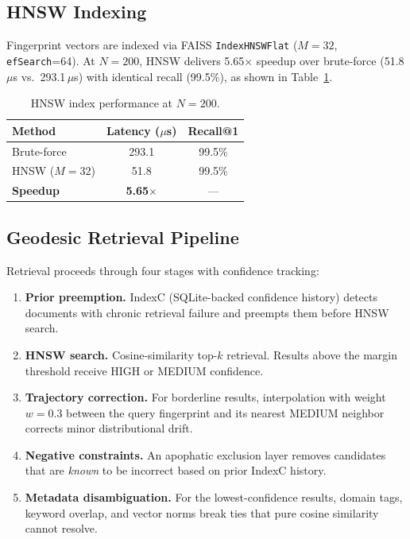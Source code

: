 \documentclass[11pt,twocolumn]{article}
\begin{document}
\subsection{HNSW Indexing}
\label{sec:hnsw}

Fingerprint vectors are indexed via FAISS \texttt{IndexHNSWFlat}
($M{=}32$, \texttt{efSearch}{=}64). At $N{=}200$, HNSW delivers
5.65$\times$ speedup over brute-force (51.8\,$\mu$s vs.\ 293.1\,$\mu$s)
with identical recall (99.5\%), as shown in Table~\ref{tab:hnsw}.

\begin{table}[t]
\centering
\caption{HNSW index performance at $N{=}200$.}
\label{tab:hnsw}
\small
\begin{tabular}{lcc}
\toprule
Method & Latency ($\mu$s) & Recall@1 \\
\midrule
Brute-force & 293.1 & 99.5\% \\
HNSW ($M{=}32$) & 51.8 & 99.5\% \\
\midrule
\textbf{Speedup} & \textbf{5.65$\times$} & --- \\
\bottomrule
\end{tabular}
\end{table}

\subsection{Geodesic Retrieval Pipeline}
\label{sec:geodesic}

Retrieval proceeds through four stages with confidence tracking:

\begin{enumerate}[leftmargin=*,itemsep=1pt]
\item[\textbf{S0.}] \textbf{Prior preemption.} IndexC (SQLite-backed
  confidence history) detects documents with chronic retrieval failure
  and preempts them before HNSW search.

\item[\textbf{S1.}] \textbf{HNSW search.} Cosine-similarity top-$k$
  retrieval. Results above the margin threshold receive HIGH or MEDIUM
  confidence.

\item[\textbf{S2.}] \textbf{Trajectory correction.} For borderline
  results, interpolation with weight $w{=}0.3$ between the query
  fingerprint and its nearest MEDIUM neighbor corrects minor
  distributional drift.

\item[\textbf{S3.}] \textbf{Negative constraints.} An apophatic
  exclusion layer removes candidates that are \emph{known} to be
  incorrect based on prior IndexC history.

\item[\textbf{S4.}] \textbf{Metadata disambiguation.} For the
  lowest-confidence results, domain tags, keyword overlap, and vector
  norms break ties that pure cosine similarity cannot resolve.
\end{enumerate}
\end{document}
